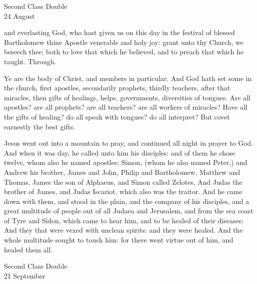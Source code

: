 \begin{inhead}
    {Second Class Double\\
24 August}
\end{inhead}

\collect
{} and everlasting God, who hast given us on this day in the festival of blessed Bartholomew thine Apostle venerable and holy joy: grant unto thy Church, we beseech thee; both to love that which he believed, and to preach that which he taught. Through.

 Ye are the body of Christ, and members in particular. And God hath set some in the church, first apostles, secondarily prophets, thirdly teachers, after that miracles, then gifts of healings, helps, governments, diversities of tongues. Are all apostles? are all prophets? are all teachers? are all workers of miracles? Have all the gifts of healing? do all speak with tongues? do all interpret? But covet earnestly the best gifts.


 Jesus went out into a mountain to pray, and continued all night in prayer to God. And when it was day, he called unto him his disciples: and of them he chose twelve, whom also he named apostles; Simon, (whom he also named Peter,) and Andrew his brother, James and John, Philip and Bartholomew, Matthew and Thomas, James the son of Alphaeus, and Simon called Zelotes, And Judas the brother of James, and Judas Iscariot, which also was the traitor. And he came down with them, and stood in the plain, and the company of his disciples, and a great multitude of people out of all Judaea and Jerusalem, and from the sea coast of Tyre and Sidon, which came to hear him, and to be healed of their diseases; And they that were vexed with unclean spirits: and they were healed. And the whole multitude sought to touch him: for there went virtue out of him, and healed them all.

\begin{inhead}
    {Second Class Double\\
21 September}
\end{inhead}


